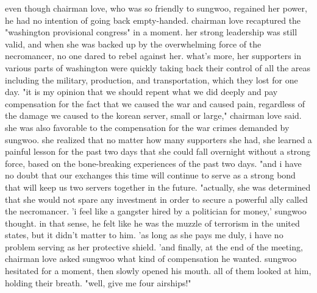 even though chairman love, who was so friendly to sungwoo, regained her power, he had no intention of going back empty-handed.
 chairman love recaptured the "washington provisional congress" in a moment.
 her strong leadership was still valid, and when she was backed up by the overwhelming force of the necromancer, no one dared to rebel against her.
 what's more, her supporters in various parts of washington were quickly taking back their control of all the areas including the military, production, and transportation, which they lost for one day.
 "it is my opinion that we should repent what we did deeply and pay compensation for the fact that we caused the war and caused pain, regardless of the damage we caused to the korean server, small or large," chairman love said.
 she was also favorable to the compensation for the war crimes demanded by sungwoo.
 she realized that no matter how many supporters she had, she learned a painful lesson for the past two days that she could fall overnight without a strong force, based on the bone-breaking experiences of the past two days.
"and i have no doubt that our exchanges this time will continue to serve as a strong bond that will keep us two servers together in the future.
"actually, she was determined that she would not spare any investment in order to secure a powerful ally called the necromancer.
'i feel like a gangster hired by a politician for money,' sungwoo thought.
 in that sense, he felt like he was the muzzle of terrorism in the united states, but it didn't matter to him.
 'as long as she pays me duly, i have no problem serving as her protective shield.
'and finally, at the end of the meeting, chairman love asked sungwoo what kind of compensation he wanted.
sungwoo hesitated for a moment, then slowly opened his mouth.
all of them looked at him, holding their breath.
"well, give me four airships!"

 